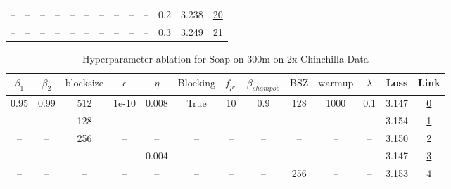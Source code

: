 \begin{table}[H]
\begin{tabular}{ccccccccccccc}
-- & -- & -- & -- & -- & -- & -- & -- & -- & -- & 0.2 & 3.238 & \href{https://wandb.ai/stanford-mercury/optimizer-scaling/runs/sweep-300m-6B-soapecd3057lr0.008-wd0.2-minlr0-warmup1000-b10.95--6c5d2b}{20} \\
-- & -- & -- & -- & -- & -- & -- & -- & -- & -- & 0.3 & 3.249 & \href{https://wandb.ai/stanford-mercury/optimizer-scaling/runs/sweep-300m-6B-soape011acelr0.008-wd0.3-minlr0-warmup1000-b10.95--3fa518}{21} \\
\bottomrule
\end{tabular}
\end{table}

\begin{table}[H]
\centering
\caption{Hyperparameter ablation for Soap on 300m on 2x Chinchilla Data}
\label{tab:ablation_soap_300m_2}
\begin{tabular}{ccccccccccccc}
\toprule
$\beta_1$ & $\beta_2$ & $\mathrm{block size}$ & $\epsilon$ & $\eta$ & $\mathrm{Blocking}$ & $f_{pc}$ & $\beta_{shampoo}$ & $\mathrm{BSZ}$ & $\mathrm{warmup}$ & $\lambda$ & Loss & Link \\
\midrule
0.95 & 0.99 & 512 & 1e-10 & 0.008 & True & 10 & 0.9 & 128 & 1000 & 0.1 & 3.147 & \href{https://wandb.ai/stanford-mercury/optimizer-scaling/runs/sweep-300m-12B-soapefe4b166lr0.008-wd0.1-minlr0-warmup1000-b10.9-cebb81}{0} \\
\midrule
-- & -- & 128 & -- & -- & -- & -- & -- & -- & -- & -- & 3.154 & \href{https://wandb.ai/stanford-mercury/optimizer-scaling/runs/sweep-300m-12B-soapeb93333lr0.008-wd0.1-minlr0-warmup1000-b10.95-feb227}{1} \\
-- & -- & 256 & -- & -- & -- & -- & -- & -- & -- & -- & 3.150 & \href{https://wandb.ai/stanford-mercury/optimizer-scaling/runs/sweep-300m-12B-soape1f2d4flr0.008-wd0.1-minlr0-warmup1000-b10.95-78cbf5}{2} \\
-- & -- & -- & -- & 0.004 & -- & -- & -- & -- & -- & -- & 3.147 & \href{https://wandb.ai/stanford-mercury/optimizer-scaling/runs/sweep-300m-12B-soapef97cdfclr0.004-wd0.1-minlr0-warmup1000-b10.9-dec1d6}{3} \\
-- & -- & -- & -- & -- & -- & -- & -- & 256 & -- & -- & 3.153 & \href{https://wandb.ai/stanford-mercury/optimizer-scaling/runs/sweep-300m-12B-soape63ad3blr0.008-wd0.1-minlr0-warmup1000-b10.95-b1cbe1}{4} \\
\bottomrule
\end{tabular}
\end{table}

